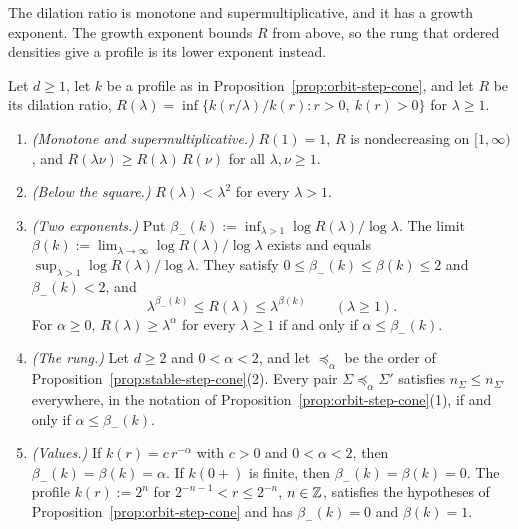 The dilation ratio is monotone and supermultiplicative, and it has a growth exponent. The growth
exponent bounds $R$ from above, so the rung that ordered densities give a profile is its lower
exponent instead.

\begin{lemma}\label{lem:dilation-ratio}
Let $d \ge 1$, let $k$ be a profile as in Proposition~\ref{prop:orbit-step-cone}, and let $R$ be its dilation ratio,
$R(\lambda) = \inf\{k(r/\lambda)/k(r) : r > 0,\ k(r) > 0\}$ for $\lambda \ge 1$.
\begin{enumerate}
\item \emph{(Monotone and supermultiplicative.)} $R(1) = 1$, $R$ is nondecreasing on $[1,\infty)$, and
$R(\lambda\nu) \ge R(\lambda)\,R(\nu)$ for all $\lambda, \nu \ge 1$.
\item \emph{(Below the square.)} $R(\lambda) < \lambda^2$ for every $\lambda > 1$.
\item \emph{(Two exponents.)} Put $\beta_-(k) := \inf_{\lambda>1}\log R(\lambda)/\log\lambda$. The
limit $\beta(k) := \lim_{\lambda\to\infty}\log R(\lambda)/\log\lambda$ exists and equals
$\sup_{\lambda>1}\log R(\lambda)/\log\lambda$. They satisfy $0 \le \beta_-(k) \le \beta(k) \le 2$ and
$\beta_-(k) < 2$, and
\[
  \lambda^{\beta_-(k)} \le R(\lambda) \le \lambda^{\beta(k)} \qquad (\lambda \ge 1) .
\]
For $\alpha \ge 0$, $R(\lambda) \ge \lambda^\alpha$ for every $\lambda \ge 1$ if and only if
$\alpha \le \beta_-(k)$.
\item \emph{(The rung.)} Let $d \ge 2$ and $0 < \alpha < 2$, and let $\preceq_\alpha$ be the order of
Proposition~\ref{prop:stable-step-cone}(2). Every pair $\Sigma \preceq_\alpha \Sigma'$ satisfies $n_\Sigma \le n_{\Sigma'}$
everywhere, in the notation of Proposition~\ref{prop:orbit-step-cone}(1), if and only if $\alpha \le \beta_-(k)$.
\item \emph{(Values.)} If $k(r) = c\,r^{-\alpha}$ with $c > 0$ and $0 < \alpha < 2$, then
$\beta_-(k) = \beta(k) = \alpha$. If $k(0{+})$ is finite, then $\beta_-(k) = \beta(k) = 0$. The profile
$k(r) := 2^n$ for $2^{-n-1} < r \le 2^{-n}$, $n \in \mathbb{Z}$, satisfies the hypotheses of
Proposition~\ref{prop:orbit-step-cone} and has $\beta_-(k) = 0$ and $\beta(k) = 1$.
\end{enumerate}
\end{lemma}

